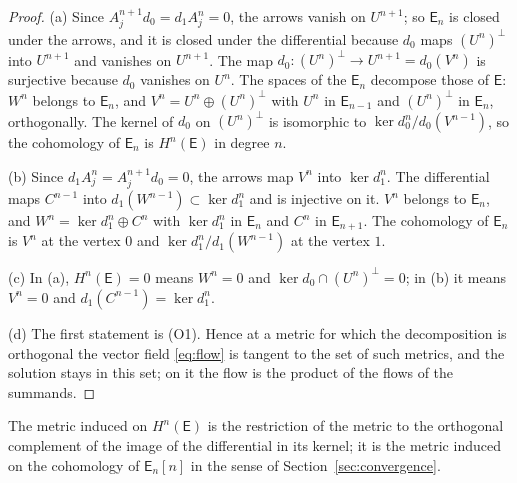 \begin{proof}
(a) Since $A_j^{n+1}d_0=d_1A_j^n=0$, the arrows vanish on $U^{n+1}$; so
$\mathsf E_n$ is closed under the arrows, and it is closed under the
differential because $d_0$ maps $(U^n)^\perp$ into $U^{n+1}$ and vanishes on
$U^{n+1}$. The map $d_0:(U^n)^\perp\to U^{n+1}=d_0(V^n)$ is surjective because
$d_0$ vanishes on $U^n$. The spaces of the $\mathsf E_n$ decompose those of
$\mathsf E$: $W^n$ belongs to $\mathsf E_n$, and $V^n=U^n\oplus(U^n)^\perp$
with $U^n$ in $\mathsf E_{n-1}$ and $(U^n)^\perp$ in $\mathsf E_n$,
orthogonally. The kernel of $d_0$ on $(U^n)^\perp$ is isomorphic to
$\ker d_0^n/d_0(V^{n-1})$, so the cohomology of $\mathsf E_n$ is
$H^n(\mathsf E)$ in degree $n$.

(b) Since $d_1A_j^n=A_j^{n+1}d_0=0$, the arrows map $V^n$ into $\ker d_1^n$.
The differential maps $C^{n-1}$ into $d_1(W^{n-1})\subset\ker d_1^n$ and is
injective on it. $V^n$ belongs to $\mathsf E_n$, and
$W^n=\ker d_1^n\oplus C^n$ with $\ker d_1^n$ in $\mathsf E_n$ and $C^n$ in
$\mathsf E_{n+1}$. The cohomology of $\mathsf E_n$ is $V^n$ at the vertex $0$
and $\ker d_1^n/d_1(W^{n-1})$ at the vertex $1$.

(c) In (a), $H^n(\mathsf E)=0$ means $W^n=0$ and $\ker d_0\cap(U^n)^\perp=0$;
in (b) it means $V^n=0$ and $d_1(C^{n-1})=\ker d_1^n$.

(d) The first statement is (O1). Hence at a metric for which the
decomposition is orthogonal the vector field \eqref{eq:flow} is tangent to the
set of such metrics, and the solution stays in this set; on it the flow is
the product of the flows of the summands.
\end{proof}

The metric induced on $H^n(\mathsf E)$ is the restriction of the metric to
the orthogonal complement of the image of the differential in its kernel; it
is the metric induced on the cohomology of $\mathsf E_n[n]$ in the sense of
Section~\ref{sec:convergence}.

